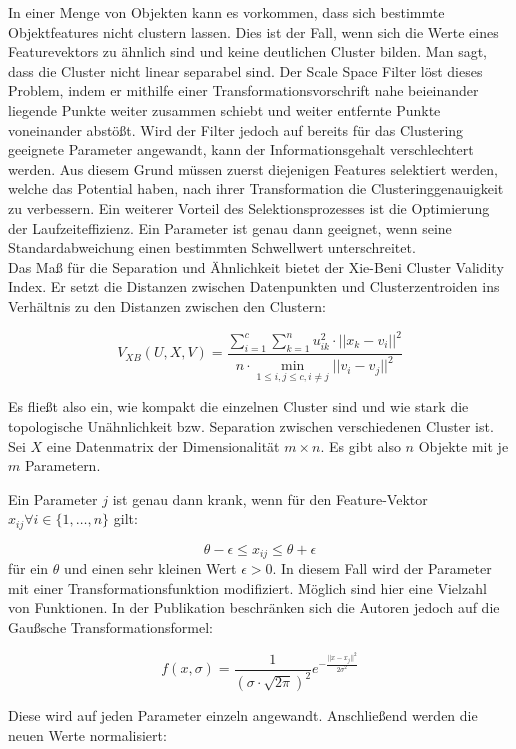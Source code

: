 \documentclass[11pt,ceqn]{book}
\begin{document}
In einer Menge von Objekten kann es vorkommen, dass sich bestimmte Objektfeatures nicht clustern lassen. Dies ist der Fall, wenn sich die Werte eines Featurevektors zu ähnlich sind und keine deutlichen Cluster bilden. Man sagt, dass die Cluster nicht linear separabel sind. Der Scale Space Filter löst dieses Problem, indem er mithilfe einer Transformationsvorschrift nahe beieinander liegende Punkte weiter zusammen schiebt und weiter entfernte Punkte voneinander abstößt. Wird der Filter jedoch auf bereits für das Clustering geeignete Parameter angewandt, kann der Informationsgehalt verschlechtert werden. Aus diesem Grund müssen zuerst diejenigen Features selektiert werden, welche das Potential haben, nach ihrer Transformation die Clusteringgenauigkeit zu verbessern. Ein weiterer Vorteil des Selektionsprozesses ist die Optimierung der Laufzeiteffizienz. Ein Parameter ist genau dann geeignet, wenn seine Standardabweichung einen bestimmten Schwellwert unterschreitet.
\\
Das Maß für die Separation und Ähnlichkeit bietet der Xie-Beni Cluster Validity Index. Er setzt die Distanzen zwischen Datenpunkten und Clusterzentroiden ins Verhältnis zu den Distanzen zwischen den Clustern:

$$V_{XB}(U,X,V)= \frac{\sum\limits_{i=1}^c \sum\limits_{k=1}^n u_{ik}^2 \cdot ||x_k-v_i||^2}{n \cdot \min\limits_{1\leqslant i,j \leqslant c, i \neq j}||v_i-v_j||^2}$$

Es fließt also ein, wie kompakt die einzelnen Cluster sind und wie stark die topologische Unähnlichkeit bzw. Separation zwischen verschiedenen Cluster ist.
\\
Sei $X$ eine Datenmatrix der Dimensionalität $m\times n$. Es gibt also $n$ Objekte mit je $m$ Parametern. 

Ein Parameter $j$ ist genau dann krank, wenn für den Feature-Vektor $x_{ij} \forall i\in \{1,\dots, n\}$ gilt:

$$\theta-\epsilon\leqslant x_{ij} \leqslant\theta+\epsilon$$ 
für ein $\theta$ und einen sehr kleinen Wert $\epsilon>0$. In diesem Fall wird der Parameter mit einer Transformationsfunktion modifiziert. Möglich sind hier eine Vielzahl von Funktionen. In der Publikation beschränken sich die Autoren jedoch auf die Gaußsche Transformationsformel:

$$f(x,\sigma) = \frac{1}{(\sigma \cdot \sqrt{2\pi})^2}e^{-\frac{||x-x_j||^2}{2\sigma^2}}$$

Diese wird auf jeden Parameter einzeln angewandt. Anschließend werden die neuen Werte normalisiert:
\end{document}
